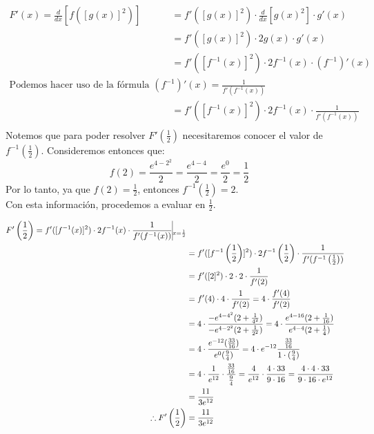 \documentclass[12pt]{article}
\begin{document}
\begin{enumerate}
  \[ \begin{equation*}
  \begin{split}
    F'(x) =\frac{d}{dx} \left[ f([g(x)]^2) \right]
    &= f'([g(x)]^2) \cdot  \frac{d}{dx} \left[g(x)^2\right] \cdot g'(x) \\
    &= f'([g(x)]^2) \cdot  2g(x) \cdot g'(x) \\
    &= f'([f^{-1}(x)]^2) \cdot  2f^{-1}(x) \cdot (f^{-1})'(x) \\
    \text{Podemos hacer uso de la fórmula } (f^{-1})'(x) = \frac{1}{f'(f^{-1}(x))}\\
    &= f'([f^{-1}(x)]^2) \cdot  2f^{-1}(x) \cdot \frac{1}{f'(f^{-1}(x))} \\
  \end{split}
\end{equation*}
\]
  Notemos que para poder resolver  $F'\left(\frac{1}{2}\right)$ necesitaremos conocer el valor de $f^{-1}\left(\frac{1}{2}\right)$. Consideremos entonces que:\\
  \[
  f(2) = \frac{e^{4-2^2}}{2} = \frac{e^{4-4}}{2} = \frac{e^{0}}{2} = \frac{1}{2}
  \]
  Por lo tanto, ya que $f(2) = \frac{1}{2}$, entonces  $f^{-1}\left(\frac{1}{2}\right) = 2$.\\
  Con esta información, procedemos a evaluar en $\frac{1}{2}$.

\[
\begin{equation*}
  \begin{split}
    F'\left(\frac{1}{2}\right) =  f'([f^{-1}(x)]^2) \cdot  2f^{-1}(x) \cdot \frac{1}{f'(f^{-1}(x))} \vline _{x=\frac{1}{2}} \\
    &=   f'([f^{-1} \left(\frac{1}{2}\right)]^2) \cdot  2f^{-1}\left(\frac{1}{2}\right) \cdot \frac{1}{f'(f^{-1}\left(\frac{1}{2}\right))}  \\
    &=   f'([2]^2) \cdot  2\cdot 2 \cdot \frac{1}{f'(2)}  \\
    &=   f'(4) \cdot 4 \cdot \frac{1}{f'(2)}  
    =  4 \cdot \frac{ f'(4)}{f'(2)}  \\
    &=  4 \cdot \frac{  -e^{4-4^2} (2 +\frac{1}{4^2}) }{ -e^{4-2^2} (2 +\frac{1}{2^2})}  
    =  4 \cdot \frac{e^{4-16} (2 +\frac{1}{16}) }{e^{4-4} (2 +\frac{1}{4})}  \\
    &=  4 \cdot \frac{e^{-12} (\frac{33}{16}) }{e^{0} (\frac{9}{4})}  
    =  4 \cdot e^{-12} \frac{\frac{33}{16}}{ 1\cdot (\frac{9}{4})}  \\
    &=  4 \cdot \frac{1}{e^{12}} \cdot \frac{\frac{33}{16}}{ \frac{9}{4}}  
    =  \frac{4}{e^{12}} \cdot \frac{4 \cdot 33}{9\cdot 16} 
    =  \frac{ 4 \cdot 4 \cdot 33}{9\cdot 16\cdot e^{12}} \\
    &=  \frac{11}{3e^{12}} \\
    \therefore
   F'\left(\frac{1}{2}\right)
    & = \frac{11}{3e^{12}}  \\
  \end{split}
\end{equation*}
\]
\end{enumerate}
\end{document}
